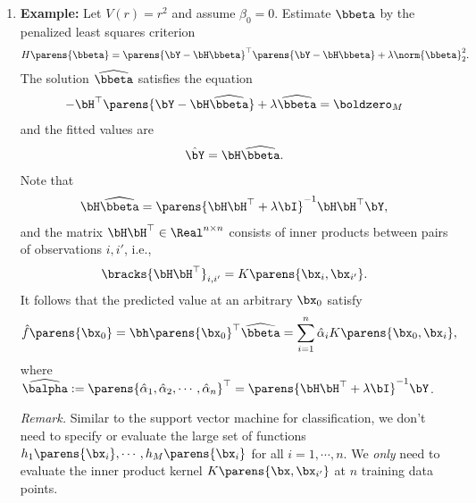 \documentclass[12pt]{article}
\begin{document}
\begin{enumerate}[label=\textbf{\arabic*.}]
	\item \textbf{Example:} Let $V(r) = r^2$ and assume $\beta_0 = 0$. Estimate $\bbeta$ by the penalized least squares criterion 
	\begin{align*}
		H \parens{\bbeta} = \parens{\bY - \bH \bbeta}^{\top} \parens{\bY - \bH \bbeta} + \lambda \norm{\bbeta}_2^2. 
	\end{align*}
	The solution $\widehat{\bbeta}$ satisfies the equation 
	\begin{align*}
		-\bH^\top \parens{\bY - \bH \widehat{\bbeta}} + \lambda \widehat{\bbeta} = \boldzero_{M}
	\end{align*}
	and the fitted values are 
	\begin{align*}
		\hat{\bY} = \bH \widehat{\bbeta}. 
	\end{align*}
	Note that 
	\begin{align*}
		\bH \widehat{\bbeta} = \parens{\bH \bH^\top + \lambda \bI}^{-1} \bH \bH^\top \bY, 
	\end{align*}
	and the matrix $\bH \bH^\top \in \Real^{n \times n}$ consists of inner products between pairs of observations $i, i'$, i.e., 
	\begin{align*}
		\bracks{\bH \bH^\top}_{i, i'} = K \parens{\bx_{i}, \bx_{i'}}. 
	\end{align*}
	It follows that the predicted value at an arbitrary $\bx_0$ satisfy 
	\begin{align*}
		\hat{f} \parens{\bx_0} = \bh \parens{\bx_0}^\top \widehat{\bbeta} = \sum_{i=1}^n \hat{\alpha}_i K \parens{\bx_0, \bx_i}, 
	\end{align*}
	where $\widehat{\balpha} := \parens{\hat{\alpha}_1, \hat{\alpha}_2, \cdots, \hat{\alpha}_n}^\top = \parens{\bH \bH^\top + \lambda \bI}^{-1} \bY$. 
	
	\textit{Remark.} Similar to the support vector machine for classification, we don't need to specify or evaluate the large set of functions $h_1 \parens{\bx_i}, \cdots, h_M \parens{\bx_i}$ for all $i = 1, \cdots, n$. We \emph{only} need to evaluate the inner product kernel $K \parens{\bx, \bx_{i'}}$ at $n$ training data points. 

\end{enumerate}

\printbibliography
\end{document}

